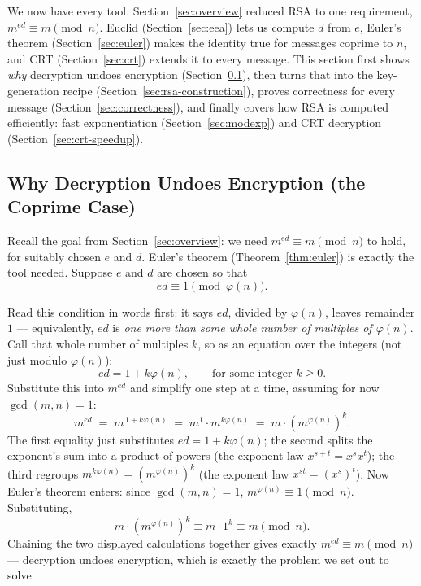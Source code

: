 \documentclass[11pt]{article}
\theoremstyle{definition}
\theoremstyle{remark}
\begin{document}
We now have every tool. Section~\ref{sec:overview} reduced RSA to one requirement, $m^{ed}\equiv m\pmod n$. Euclid (Section~\ref{sec:eea}) lets us compute $d$ from $e$, Euler's theorem (Section~\ref{sec:euler}) makes the identity true for messages coprime to $n$, and CRT (Section~\ref{sec:crt}) extends it to every message. This section first shows \emph{why} decryption undoes encryption (Section~\ref{sec:why-works}), then turns that into the key-generation recipe (Section~\ref{sec:rsa-construction}), proves correctness for every message (Section~\ref{sec:correctness}), and finally covers how RSA is computed efficiently: fast exponentiation (Section~\ref{sec:modexp}) and CRT decryption (Section~\ref{sec:crt-speedup}).

\subsection{Why Decryption Undoes Encryption (the Coprime Case)}\label{sec:why-works}

Recall the goal from Section~\ref{sec:overview}: we need $m^{ed}\equiv m\pmod n$ to hold, for suitably chosen $e$ and $d$. Euler's theorem (Theorem~\ref{thm:euler}) is exactly the tool needed. Suppose $e$ and $d$ are chosen so that
\[
ed \equiv 1 \pmod{\varphi(n)}.
\]

Read this condition in words first: it says $ed$, divided by $\varphi(n)$, leaves remainder $1$ — equivalently, $ed$ is \emph{one more than some whole number of multiples of $\varphi(n)$}. Call that whole number of multiples $k$, so as an equation over the integers (not just modulo $\varphi(n)$):
\[
ed = 1 + k\varphi(n), \qquad \text{for some integer } k \ge 0.
\]
Substitute this into $m^{ed}$ and simplify one step at a time, assuming for now $\gcd(m,n)=1$:
\[
m^{ed} \;=\; m^{\,1+k\varphi(n)} \;=\; m^{1}\cdot m^{k\varphi(n)} \;=\; m\cdot\left(m^{\varphi(n)}\right)^{k}.
\]
The first equality just substitutes $ed=1+k\varphi(n)$; the second splits the exponent's sum into a product of powers (the exponent law $x^{s+t}=x^sx^t$); the third regroups $m^{k\varphi(n)}=(m^{\varphi(n)})^k$ (the exponent law $x^{st}=(x^s)^t$). Now Euler's theorem enters: since $\gcd(m,n)=1$, $m^{\varphi(n)}\equiv1\pmod n$. Substituting,
\[
m\cdot\left(m^{\varphi(n)}\right)^{k} \equiv m\cdot1^{k} \equiv m \pmod n.
\]
Chaining the two displayed calculations together gives exactly $m^{ed}\equiv m\pmod n$ --- decryption undoes encryption, which is exactly the problem we set out to solve.
\end{document}

